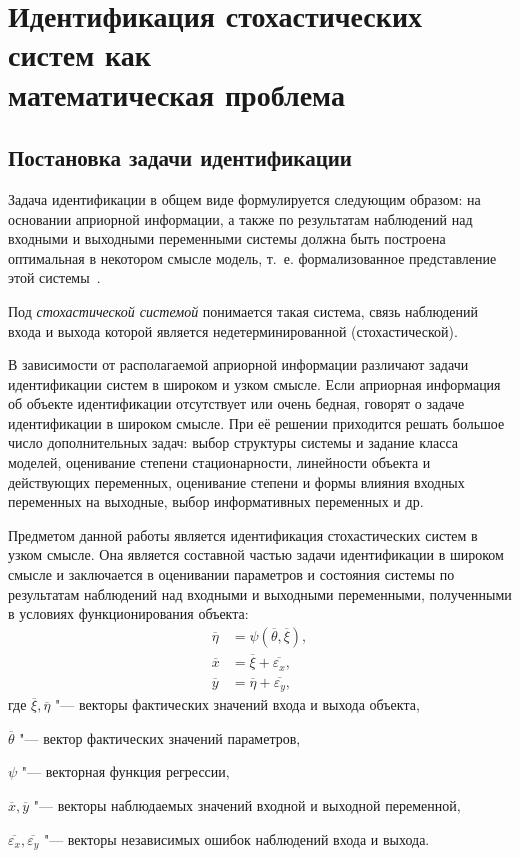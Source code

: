 \section[Идентификация стохастических систем как математическая проблема]{%
  Идентификация стохастических систем как \\
  математическая проблема}

\subsection{Постановка задачи идентификации}

Задача идентификации в общем виде формулируется следующим образом:
на основании априорной информации, а также по результатам наблюдений над
входными и выходными переменными системы должна быть построена оптимальная в
некотором смысле модель, т.~е. формализованное представление этой системы~\cite{eikhoff_1975}.

Под \emph{стохастической системой} понимается такая система,
связь наблюдений входа и выхода которой является недетерминированной (стохастической).

В зависимости от располагаемой априорной информации различают
задачи идентификации систем в широком и узком смысле.
Если априорная информация об объекте идентификации отсутствует
или очень бедная, говорят о задаче идентификации в широком смысле.
При её решении приходится решать большое число дополнительных задач:
выбор структуры системы и задание класса моделей,
оценивание степени стационарности, линейности объекта и действующих переменных,
оценивание степени и формы влияния входных переменных на выходные,
выбор информативных переменных и др.

Предметом данной работы является идентификация стохастических систем в узком смысле.
Она является составной частью задачи идентификации в широком смысле
и заключается в оценивании параметров и состояния системы по результатам
наблюдений над входными и выходными переменными, полученными в условиях функционирования объекта:
\begin{equation}
  \label{eq:model_general}
  \begin{aligned}
    \overline{\eta} &= \psi (\overline{\theta}, \overline{\xi}), \\
    \overline{x} &= \overline{\xi} + \overline{\varepsilon_x}, \\
    \overline{y} &= \overline{\eta} + \overline{\varepsilon_y},
  \end{aligned}
\end{equation}
где \( \overline{\xi}, \overline{\eta} \)
"--- векторы фактических значений входа и выхода объекта, \par
\( \overline{\theta} \)
"--- вектор фактических значений параметров, \par
\( \psi \)
"--- векторная функция регрессии, \par
\( \overline{x}, \overline{y} \)
"--- векторы наблюдаемых значений входной и выходной переменной, \par
\( \overline{\varepsilon_x}, \overline{\varepsilon_y} \)
"--- векторы независимых ошибок наблюдений входа и выхода.

